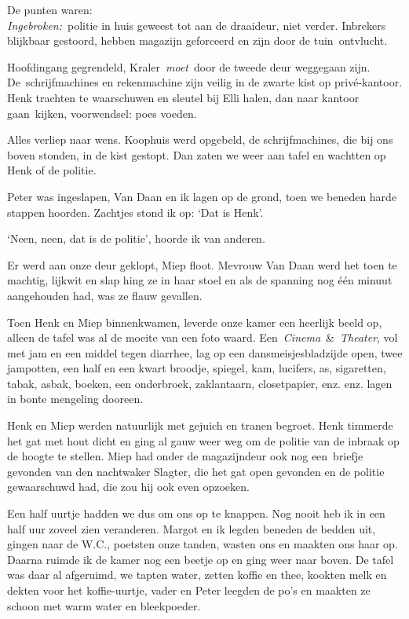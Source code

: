 \documentclass{book}
\begin{document}
De punten waren:\\
\emph{Ingebroken:}~politie in huis geweest tot aan de
draaideur, niet verder. Inbrekers blijkbaar gestoord, hebben magazijn geforceerd
en zijn door de tuin~ontvlucht.

Hoofdingang gegrendeld, Kraler~\emph{moet}~door de tweede deur weggegaan zijn.
De~schrijfmachines en rekenmachine zijn veilig in de zwarte kist op
privé-kantoor. Henk trachten te waarschuwen en sleutel bij Elli halen, dan naar
kantoor gaan~kijken, voorwendsel: poes voeden.

Alles verliep naar wens. Koophuis werd opgebeld, de schrijfmachines, die bij ons
boven stonden, in de kist gestopt. Dan zaten we weer aan tafel en wachtten op
Henk of de politie.

Peter was ingeslapen, Van Daan en ik lagen op de grond, toen we beneden harde
stappen hoorden. Zachtjes stond ik op: `Dat is Henk'.

`Neen, neen, dat is de politie', hoorde ik van anderen.

Er werd aan onze deur geklopt, Miep floot. Mevrouw Van Daan werd het toen te
machtig, lijkwit en slap hing ze in haar stoel en als de spanning nog één minuut
aangehouden had, was ze flauw gevallen.

Toen Henk en Miep binnenkwamen, leverde onze kamer een heerlijk beeld op, alleen
de tafel was al de moeite van een foto waard.
Een~\emph{Cinema}~\&~\emph{Theater}, vol met jam en een middel tegen diarrhee,
lag op een dansmeisjesbladzijde open, twee jampotten, een half en een kwart
broodje, spiegel, kam, lucifers, as, sigaretten, tabak, asbak, boeken, een
onderbroek, zaklantaarn, closetpapier, enz. enz.  lagen in bonte mengeling
dooreen.

Henk en Miep werden natuurlijk met gejuich en tranen begroet. Henk timmerde het
gat met hout dicht en ging al gauw weer weg om de politie van de inbraak op de
hoogte te stellen. Miep had onder de magazijndeur ook nog een~briefje gevonden
van den nachtwaker Slagter, die het gat open gevonden en de politie gewaarschuwd
had, die zou hij ook even opzoeken.

Een half uurtje hadden we dus om ons op te knappen. Nog nooit heb ik in een half
uur zoveel zien veranderen. Margot en ik legden beneden de bedden uit, gingen
naar de W.C., poetsten onze tanden, wasten ons en maakten ons haar op. Daarna
ruimde ik de kamer nog een beetje op en ging weer naar boven. De tafel was daar
al afgeruimd, we tapten water, zetten koffie en thee, kookten melk en dekten
voor het koffie-uurtje, vader en Peter leegden de po's en maakten ze schoon met
warm water en bleekpoeder.
\end{document}
